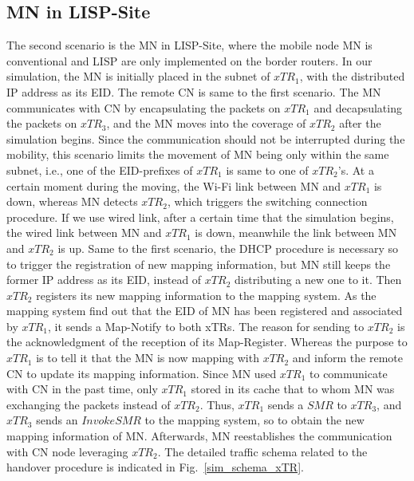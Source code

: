 \subsection{MN in LISP-Site}
\label{sec:ns3_analysis_xTR}
The second scenario is the MN in LISP-Site, where the mobile node MN is conventional and LISP are only implemented on the border routers. In our simulation, the MN is initially placed in the subnet of $xTR_1$, with the distributed IP address as its EID. The remote CN is same to the first scenario. The MN communicates with CN by encapsulating the packets on $xTR_1$ and decapsulating the packets on $xTR_3$, and the MN moves into the coverage of $xTR_2$ after the simulation begins. Since the communication should not be interrupted during the mobility, this scenario limits the movement of MN being only within the same subnet, i.e., one of the EID-prefixes of $xTR_1$ is same to one of $xTR_2$'s. At a certain moment during the moving, the Wi-Fi link between MN and $xTR_1$ is down, whereas MN detects $xTR_2$, which triggers the switching connection procedure. If we use wired link, after a certain time that the simulation begins, the wired link between MN and $xTR_1$ is down, meanwhile the link between MN and $xTR_2$ is up. Same to the first scenario, the DHCP procedure is necessary so to trigger the registration of new mapping information, but MN still keeps the former IP address as its EID, instead of $xTR_2$ distributing a new one to it. Then $xTR_2$ registers its new mapping information to the mapping system. As the mapping system find out that the EID of MN has been registered and associated by $xTR_1$, it sends a Map-Notify to both xTRs. The reason for sending to $xTR_2$ is the acknowledgment of the reception of its Map-Register. Whereas the purpose to $xTR_1$ is to tell it that the MN is now mapping with $xTR_2$ and inform the remote CN to update its mapping information. Since MN used $xTR_1$ to communicate with CN in the past time, only $xTR_1$ stored in its cache that to whom MN was exchanging the packets instead of $xTR_2$. Thus, $xTR_1$ sends a $SMR$ to $xTR_3$, and $xTR_3$ sends an $Invoke SMR$ to the mapping system, so to obtain the new mapping information of MN. Afterwards, MN reestablishes the communication with CN node leveraging $xTR_2$. The detailed traffic schema related to the handover procedure is indicated in Fig.~\ref{sim_schema_xTR}.
